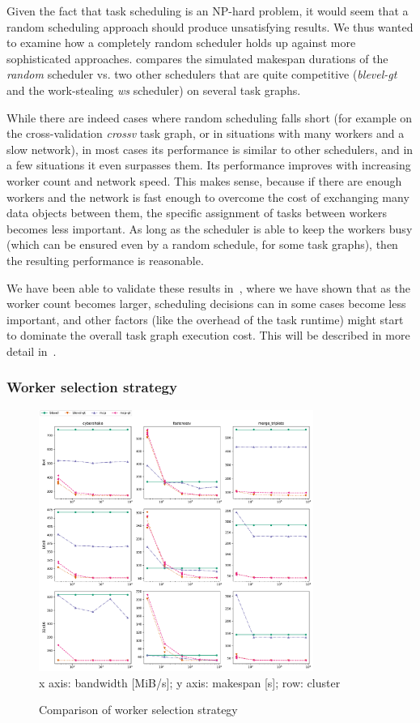 Given the fact that task scheduling is an NP-hard problem, it would seem that a random scheduling
approach should produce unsatisfying results. We thus wanted to examine how a completely random
scheduler holds up against more sophisticated approaches.  compares the
simulated makespan durations of the \emph{random} scheduler vs. two other schedulers that
are quite competitive (\emph{blevel-gt} and the work-stealing \emph{ws}
scheduler) on several task graphs.

While there are indeed cases where random scheduling falls short (for example on the
cross-validation \emph{crossv} task graph, or in situations with many workers and a slow
network), in most cases its performance is similar to other schedulers, and in a few situations it
even surpasses them. Its performance improves with increasing worker count and network speed. This
makes sense, because if there are enough workers and the network is fast enough to overcome the
cost of exchanging many data objects between them, the specific assignment of tasks between workers
becomes less important. As long as the scheduler is able to keep the workers busy (which can be
ensured even by a random schedule, for some task graphs), then the resulting performance is
reasonable.

We have been able to validate these results in~\cite{rsds}, where we have shown that as
the worker count becomes larger, scheduling decisions can in some cases become less important, and
other factors (like the overhead of the task runtime) might start to dominate the overall task
graph execution cost. This will be described in more detail in~.

\subsubsection*{Worker selection strategy}

\begin{figure}
	\centering
	\includegraphics[width=0.8\textwidth]{imgs/estee/charts/gt-scheduler}\\
	{\small x axis: bandwidth [MiB/s]; y axis: makespan [s]; row: cluster}
	\caption{Comparison of worker selection strategy}
	\label{fig:estee-chart-gt-scheduler}
\end{figure}

